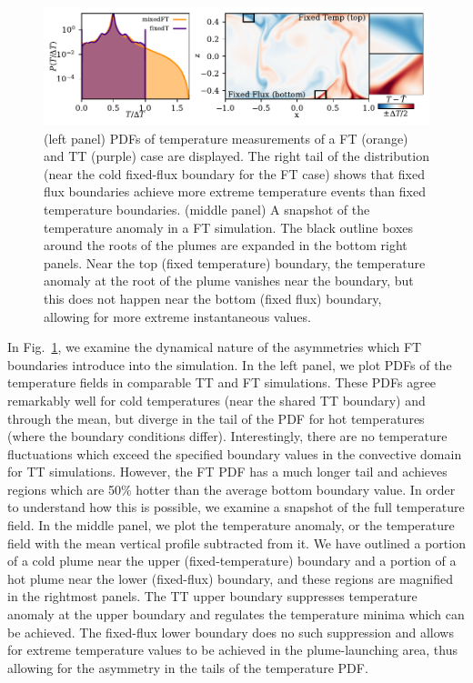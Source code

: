 \documentclass[aps, pre, onecolumn, nofootinbib, notitlepage, groupedaddress, amsfonts, amssymb, amsmath, longbibliography, superscriptaddress]{revtex4-1}
\begin{document}
\begin{figure}
\includegraphics[width=\textwidth]{./figs/rbc_dynamics_asymmetries.pdf}
\caption{ 
	(left panel) PDFs of temperature measurements of a FT (orange) and TT (purple) case are displayed.
	The right tail of the distribution (near the cold fixed-flux boundary for the FT case) shows that fixed flux boundaries achieve more extreme temperature events than fixed temperature boundaries.
	(middle panel) A snapshot of the temperature anomaly in a FT simulation.
	The black outline boxes around the roots of the plumes are expanded in the bottom right panels.
	Near the top (fixed temperature) boundary, the temperature anomaly at the root of the plume vanishes near the boundary, but this does not happen near the bottom (fixed flux) boundary, allowing for more extreme instantaneous values.
\label{fig:rbc_dynamics_asymmetries} }
\end{figure}

In Fig.~\ref{fig:rbc_dynamics_asymmetries}, we examine the dynamical nature of the asymmetries which FT boundaries introduce into the simulation.
In the left panel, we plot PDFs of the temperature fields in comparable TT and FT simulations.
These PDFs agree remarkably well for cold temperatures (near the shared TT boundary) and through the mean, but diverge in the tail of the PDF for hot temperatures (where the boundary conditions differ).
Interestingly, there are no temperature fluctuations which exceed the specified boundary values in the convective domain for TT simulations.
However, the FT PDF has a much longer tail and achieves regions which are 50\% hotter than the average bottom boundary value.
In order to understand how this is possible, we examine a snapshot of the full temperature field.
In the middle panel, we plot the temperature anomaly, or the temperature field with the mean vertical profile subtracted from it.
We have outlined a portion of a cold plume near the upper (fixed-temperature) boundary and a portion of a hot plume near the lower (fixed-flux) boundary, and these regions are magnified in the rightmost panels.
The TT upper boundary suppresses temperature anomaly at the upper boundary and regulates the temperature minima which can be achieved.
The fixed-flux lower boundary does no such suppression and allows for extreme temperature values to be achieved in the plume-launching area, thus allowing for the asymmetry in the tails of the temperature PDF.
\end{document}

